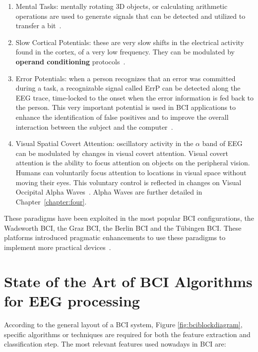 \begin{enumerate}
\item Mental Tasks: mentally rotating 3D objects, or calculating arithmetic operations are used to generate signals that can be detected and utilized to transfer a bit~\cite{Shin2018}.
\item Slow Cortical Potentials: these are very slow shifts in the electrical activity found in the cortex, of a very low frequency.  They can be modulated by \textbf{operand conditioning} protocols~\cite{WolpawJonathanR2012}.
\item Error Potentials: when a person recognizes that an error was committed during a task, a recognizable signal called ErrP can be detected along the EEG trace, time-locked to the onset when the error information is fed back to the person.  This very important potential is used in BCI applications to enhance the identification of false positives and to improve the overall interaction between the subject and the computer~\cite{Cruz2018}.
\item Visual Spatial Covert Attention: oscillatory activity in the $\alpha$ band of EEG can be modulated by changes in visual covert attention.  Visual covert attention is the ability to focus attention on objects on the peripheral vision.  Humans can voluntarily focus attention to locations in visual space without moving their eyes.  This voluntary control is reflected in changes on Visual Occipital Alpha Waves~\cite{c62}.  Alpha Waves are further detailed in Chapter~\ref{chapter:four}.
\end{enumerate}

These paradigms have been exploited in the most popular BCI configurations, the Wadsworth BCI, the Graz BCI, the Berlin BCI and the Tübingen BCI.  These platforms introduced pragmatic enhancements to use these paradigms to implement more practical devices~\cite{Nam2018,Schomer2010,Blankertz2008,Pfurtscheller2003,Neumann2003,Vaughan2006}.



\section{State of the Art of BCI Algorithms for EEG processing}

According to the general layout of a BCI system, Figure \ref{fig:bciblockdiagram}, specific algorithms or techniques are required for both the feature extraction and classification step.  The most relevant features used nowadays in BCI are:

